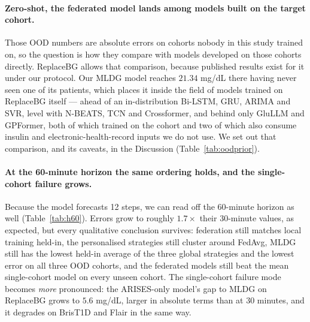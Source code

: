 \documentclass[10pt,letterpaper]{article}
\begin{document}
\paragraph{Zero-shot, the federated model lands among models built on the
target cohort.} Those OOD numbers are absolute errors on cohorts nobody in this
study trained on, so the question is how they compare with models developed on
those cohorts directly. ReplaceBG allows that comparison, because published
results exist for it under our protocol. Our MLDG model reaches $21.34$ mg/dL
there having never seen one of its patients, which places it inside the field of
models trained on ReplaceBG itself --- ahead of an in-distribution Bi-LSTM, GRU,
ARIMA and SVR, level with N-BEATS, TCN and Crossformer, and behind only GluLLM
and GPFormer, both of which trained on the cohort and two of which also consume
insulin and electronic-health-record inputs we do not use. We set out that
comparison, and its caveats, in the Discussion (Table~\ref{tab:oodprior}).

\paragraph{At the 60-minute horizon the same ordering holds, and the
single-cohort failure grows.} Because the model forecasts 12 steps, we can read
off the 60-minute horizon as well (Table~\ref{tab:h60}). Errors grow to roughly
$1.7\times$ their 30-minute values, as expected, but every qualitative
conclusion survives: federation still matches local training held-in, the
personalised strategies still cluster around FedAvg, MLDG still has the lowest
held-in average of the three global strategies and the lowest error on all three
OOD cohorts, and the federated models still beat the mean single-cohort model on
every unseen cohort. The single-cohort failure mode becomes \emph{more}
pronounced: the ARISES-only model's gap to MLDG on ReplaceBG grows to $5.6$
mg/dL, larger in absolute terms than at 30 minutes, and it degrades on BrisT1D
and Flair in the same way.
\end{document}
